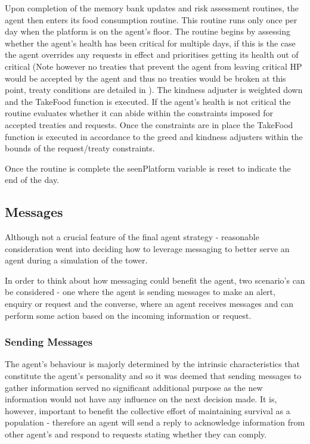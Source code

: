 Upon completion of the memory bank updates and risk assessment routines, the agent then enters its food consumption routine. This routine runs only once per day when the platform is on the agent's floor. The routine begins by assessing whether the agent's health has been critical for multiple days, if this is the case the agent overrides any requests in effect and prioritises getting its health out of critical (Note however no treaties that prevent the agent from leaving critical HP would be accepted by the agent and thus no treaties would be broken at this point, treaty conditions are detailed in ). The kindness adjuster is weighted down and the TakeFood function is executed. If the agent's health is not critical the routine evaluates whether it can abide within the constraints imposed for accepted treaties and requests. Once the constraints are in place the TakeFood function is executed in accordance to the greed and kindness adjusters within the bounds of the request/treaty constraints. 

Once the routine is complete the seenPlatform variable is reset to indicate the end of the day.

\subsection{Messages}
\label{subsec: Messages}
Although not a crucial feature of the final agent strategy - reasonable consideration went into deciding how to leverage messaging to better serve an agent during a simulation of the tower.

In order to think about how messaging could benefit the agent, two scenario's can be considered - one where the agent is sending messages to make an alert, enquiry or request and the converse, where an agent receives messages and can perform some action based on the incoming information or request.
\subsubsection{Sending Messages}
\label{subsubsec: Sending Messages}
The agent's behaviour is majorly determined by the intrinsic characteristics that constitute the agent's personality and so it was deemed that sending messages to gather information served no significant additional purpose as the new information would not have any influence on the next decision made. It is, however, important to benefit the collective effort of maintaining survival as a population - therefore an agent will send a reply to acknowledge information from other agent's and respond to requests stating whether they can comply.

